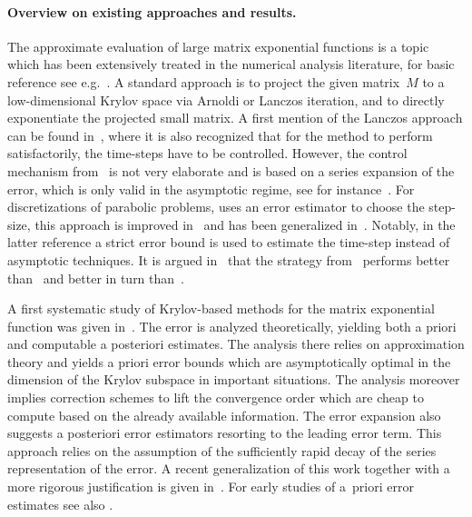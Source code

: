 \documentclass[smallextended]{svjour3pre}%
\numberwithin{equation}{section}
\numberwithin{figure}{section}
\numberwithin{table}{section}
\newcommand\tjnew[1]{{#1}}
\begin{document}
\paragraph{Overview on existing approaches and results.}
The approximate evaluation of large matrix exponential functions
is a topic which has been extensively treated in the numerical
analysis literature, for basic reference see e.g.~\cite{golloa89,molloa03}.
A standard approach is to project the given
matrix~$ M $ to a low-dimensional Krylov space via \tjnew{Arnoldi or Lanczos iteration},
and to directly exponentiate the projected small matrix.
A first mention of the Lanczos approach
can be found in~\cite{parlig86}, where it is also
recognized that for the method
to perform satisfactorily, the time-steps have to be controlled.
However, the control mechanism from~\cite{parlig86} is not
very elaborate and is based on a series expansion of the error, which
is only valid in the asymptotic regime, see for instance~\cite{niewri12}.
For discretizations of parabolic problems, \cite{galsaa92} uses an error estimator to choose
the step-size, this approach is improved in~\cite{steley96} and has been
generalized in~\cite{mohcar10}. Notably, in the latter reference a strict error bound is
used to estimate the time-step instead of asymptotic techniques. 
\tjnew{It is argued in~\cite{mohcar10} that the
strategy from~\cite{mohcar10} performs better than~\cite{mohauer06} and
better in turn than~\cite{parlig86}.}

A first systematic study of Krylov-based methods
for the matrix exponential function was
given in~\cite{saad92s}. The error
is analyzed theoretically, yielding both a priori and
computable a posteriori estimates. The analysis there relies on
approximation theory and yields a priori error bounds which are
asymptotically optimal in the dimension of the Krylov subspace in important situations. The analysis moreover
implies correction schemes to lift the convergence order which are cheap to compute based on
the already available information. The error expansion also
suggests a posteriori error estimators resorting to the
leading error term.
This approach relies on the assumption of the sufficiently rapid decay of the
\tjnew{series representation of the error}. A recent generalization of this work together
with a more rigorous justification is given in~\cite{chinesen17}.
\tjnew{For early studies of a~priori error estimates see also \cite{DK89,DK95}.}
\end{document}
